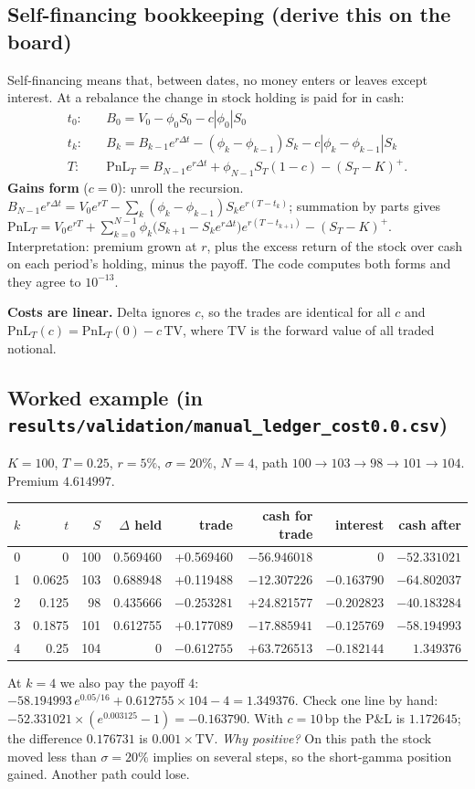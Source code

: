 \documentclass[10.5pt,a4paper]{article}
\newcommand{\PnL}{\mathrm{PnL}_T}
\begin{document}
\subsection{Self-financing bookkeeping (derive this on the board)}
Self-financing means that, between dates, no money enters or leaves except interest. At a rebalance the change in stock holding is paid for in cash:
\begin{align*}
t_0:&\quad B_0=V_0-\phi_0S_0-c|\phi_0|S_0\\
t_k:&\quad B_k=B_{k-1}e^{r\Delta t}-(\phi_k-\phi_{k-1})S_k-c|\phi_k-\phi_{k-1}|S_k\\
T:&\quad \PnL=B_{N-1}e^{r\Delta t}+\phi_{N-1}S_T(1-c)-(S_T-K)^+.
\end{align*}
\textbf{Gains form} ($c=0$): unroll the recursion. $B_{N-1}e^{r\Delta t}=V_0e^{rT}-\sum_k(\phi_k-\phi_{k-1})S_ke^{r(T-t_k)}$; summation by parts gives
$\PnL=V_0e^{rT}+\sum_{k=0}^{N-1}\phi_k\big(S_{k+1}-S_ke^{r\Delta t}\big)e^{r(T-t_{k+1})}-(S_T-K)^+$.
Interpretation: premium grown at $r$, plus the excess return of the stock over cash on each period's holding, minus the payoff. The code computes both forms and they agree to $10^{-13}$.

\textbf{Costs are linear.} Delta ignores $c$, so the trades are identical for all $c$ and $\PnL(c)=\PnL(0)-c\,\mathrm{TV}$, where $\mathrm{TV}$ is the forward value of all traded notional.

\subsection{Worked example (in \texttt{results/validation/manual\_ledger\_cost0.0.csv})}
$K=100$, $T=0.25$, $r=5\%$, $\sigma=20\%$, $N=4$, path $100\to103\to98\to101\to104$. Premium $4.614997$.
\begin{center}\small\begin{tabular}{rrrrrrrr}\toprule
$k$ & $t$ & $S$ & $\Delta$ held & trade & cash for trade & interest & cash after\\\midrule
0&0&100&0.569460&+0.569460&$-56.946018$&0&$-52.331021$\\
1&0.0625&103&0.688948&+0.119488&$-12.307226$&$-0.163790$&$-64.802037$\\
2&0.125&98&0.435666&$-0.253281$&+24.821577&$-0.202823$&$-40.183284$\\
3&0.1875&101&0.612755&+0.177089&$-17.885941$&$-0.125769$&$-58.194993$\\
4&0.25&104&0&$-0.612755$&+63.726513&$-0.182144$&$1.349376$\\\bottomrule
\end{tabular}\end{center}
At $k=4$ we also pay the payoff $4$: $-58.194993\,e^{0.05/16}+0.612755\times104-4=1.349376$. Check one line by hand:
$-52.331021\times(e^{0.003125}-1)=-0.163790$. With $c=10$\,bp the P\&L is $1.172645$; the difference $0.176731$ is $0.001\times\mathrm{TV}$.
\emph{Why positive?} On this path the stock moved less than $\sigma=20\%$ implies on several steps, so the short-gamma position gained. Another path could lose.
\end{document}
